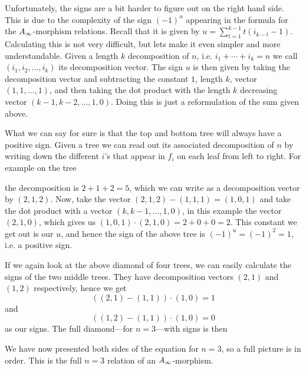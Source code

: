 Unfortunately, the signs are a bit harder to figure out on the right hand side. This is due to the complexity of the sign $(-1)^{u}$ appearing in the formula for the $A_{\infty}$-morphism relations. Recall that it is given by $u = \displaystyle \sum_{t=1}^{k-1}t(i_{k-t}-1)$. Calculating this is not very difficult, but lets make it even simpler and more understandable. Given a length $k$ decomposition of $n$, i.e. $i_1+\cdots +i_k = n$ we call $(i_1, i_2, \ldots, i_k)$ its decomposition vector. The sign $u$ is then given by taking the decomposition vector and subtracting the constant $1$, length $k$, vector $(1,1,\ldots, 1)$, and then taking the dot product with the length $k$ decreasing vector $(k-1, k-2, \ldots, 1, 0)$. Doing this is just a reformulation of the sum given above. 


What we can say for sure is that the top and bottom tree will always have a positive sign. Given a tree we can read out its associated decomposition of $n$ by writing down the different $i$'s that appear in $f_i$ on each leaf from left to right. For example on the tree


the decomposition is $2+1+2=5$, which we can write as a decomposition vector by $(2,1,2)$. Now, take the vector $(2,1,2) - (1,1,1) = (1,0,1)$ and take the dot product with a vector $(k, k-1, \ldots, 1, 0)$, in this example the vector $(2,1,0)$, which gives us $(1,0,1)\cdot (2,1,0)= 2+0+0=2$. This constant we get out is our $u$, and hence the sign of the above tree is $(-1)^u = (-1)^2 = 1$, i.e. a positive sign. 

If we again look at the above diamond of four trees, we can easily calculate the signs of the two middle trees. They have decomposition vectors $(2,1)$ and $(1,2)$ respectively, hence we get
\begin{equation*}
    ((2,1)-(1,1))\cdot (1,0) = 1
\end{equation*}
and
\begin{equation*}
    ((1,2)-(1,1))\cdot (1,0) = 0
\end{equation*}
as our signs. The full diamond---for $n=3$---with signs is then



We have now presented both sides of the equation for $n=3$, so a full picture is in order. This is the full $n=3$ relation of an $A_{\infty}$-morphism.


